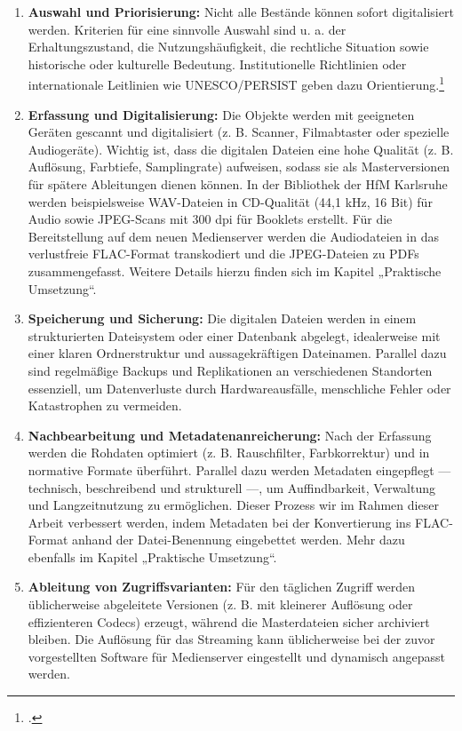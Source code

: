 \documentclass[12pt,a4paper]{report}
\begin{document}
  \begin{enumerate}
    \item \textbf{Auswahl und Priorisierung:}  
      Nicht alle Bestände können sofort digitalisiert werden. 
      Kriterien für eine sinnvolle Auswahl sind u. a. der Erhaltungszustand, die Nutzungshäufigkeit, die rechtliche Situation sowie historische oder kulturelle Bedeutung. Institutionelle Richtlinien oder internationale Leitlinien wie UNESCO/PERSIST geben dazu Orientierung.\footcite[Vgl.][]{unesco_persist_guidelines}  

    \item \textbf{Erfassung und Digitalisierung:}  
      Die Objekte werden mit geeigneten Geräten gescannt und digitalisiert (z. B. Scanner, Filmabtaster oder spezielle Audiogeräte). 
      Wichtig ist, dass die digitalen Dateien eine hohe Qualität (z. B. Auflösung, Farbtiefe, Samplingrate) aufweisen, 
      sodass sie als Masterversionen für spätere Ableitungen dienen können.  
      In der Bibliothek der HfM Karlsruhe werden beispielsweise WAV-Dateien in CD-Qualität (44,1 kHz, 16 Bit) für Audio sowie JPEG-Scans mit 300 dpi für Booklets erstellt.  
      Für die Bereitstellung auf dem neuen Medienserver werden die Audiodateien in das verlustfreie FLAC-Format transkodiert und die JPEG-Dateien zu PDFs zusammengefasst.  
      Weitere Details hierzu finden sich im Kapitel „Praktische Umsetzung“.  
    
    \item \textbf{Speicherung und Sicherung:}
      Die digitalen Dateien werden in einem strukturierten Dateisystem oder einer Datenbank abgelegt, 
      idealerweise mit einer klaren Ordnerstruktur und aussagekräftigen Dateinamen. 
      Parallel dazu sind regelmäßige Backups und Replikationen an verschiedenen Standorten essenziell, 
      um Datenverluste durch Hardwareausfälle, menschliche Fehler oder Katastrophen zu vermeiden.
  
    \item \textbf{Nachbearbeitung und Metadatenanreicherung:}  
      Nach der Erfassung werden die Rohdaten optimiert (z. B. Rauschfilter, Farbkorrektur) und in normative Formate überführt. 
      Parallel dazu werden Metadaten eingepflegt — technisch, beschreibend und strukturell —, um Auffindbarkeit, Verwaltung und Langzeitnutzung zu ermöglichen.
      Dieser Prozess wir im Rahmen dieser Arbeit verbessert werden, indem Metadaten bei der Konvertierung ins FLAC-Format anhand der Datei-Benennung eingebettet werden.
      Mehr dazu ebenfalls im Kapitel „Praktische Umsetzung“.

    \item \textbf{Ableitung von Zugriffsvarianten:}  
      Für den täglichen Zugriff werden üblicherweise abgeleitete Versionen (z. B. mit kleinerer Auflösung oder effizienteren Codecs) erzeugt,
      während die Masterdateien sicher archiviert bleiben.
      Die Auflösung für das Streaming kann üblicherweise bei der zuvor vorgestellten Software für Medienserver eingestellt und dynamisch angepasst werden.
  \end{enumerate} 
\end{document}
